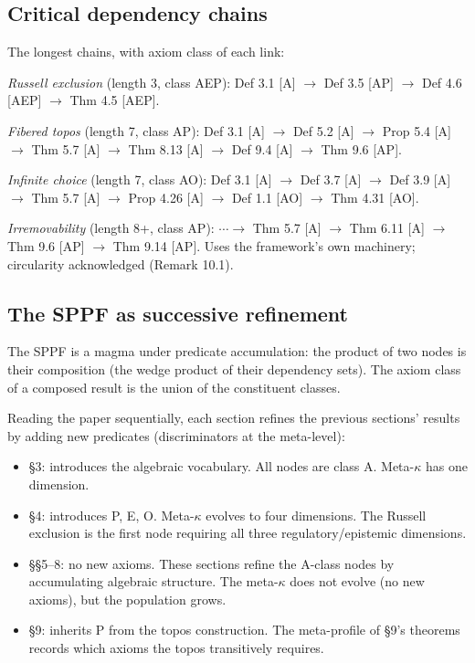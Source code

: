 \subsection{Critical dependency chains}

The longest chains, with axiom class of each link:

\emph{Russell exclusion} (length 3, class \textsf{AEP}):
Def 3.1 [\textsf{A}] $\to$ Def 3.5 [\textsf{AP}]
$\to$ Def 4.6 [\textsf{AEP}] $\to$ Thm 4.5 [\textsf{AEP}].

\emph{Fibered topos} (length 7, class \textsf{AP}):
Def 3.1 [\textsf{A}] $\to$ Def 5.2 [\textsf{A}]
$\to$ Prop 5.4 [\textsf{A}] $\to$ Thm 5.7 [\textsf{A}]
$\to$ Thm 8.13 [\textsf{A}] $\to$ Def 9.4 [\textsf{A}]
$\to$ Thm 9.6 [\textsf{AP}].

\emph{Infinite choice} (length 7, class \textsf{AO}):
Def 3.1 [\textsf{A}] $\to$ Def 3.7 [\textsf{A}]
$\to$ Def 3.9 [\textsf{A}] $\to$ Thm 5.7 [\textsf{A}]
$\to$ Prop 4.26 [\textsf{A}] $\to$ Def 1.1 [\textsf{AO}]
$\to$ Thm 4.31 [\textsf{AO}].

\emph{Irremovability} (length 8+, class \textsf{AP}):
$\cdots \to$ Thm 5.7 [\textsf{A}] $\to$ Thm 6.11
[\textsf{A}] $\to$ Thm 9.6 [\textsf{AP}] $\to$
Thm 9.14 [\textsf{AP}]. Uses the framework's own
machinery; circularity acknowledged (Remark 10.1).

\subsection{The SPPF as successive refinement}

The SPPF is a magma under predicate accumulation: the
product of two nodes is their composition (the wedge
product of their dependency sets). The axiom class of a
composed result is the union of the constituent classes.

Reading the paper sequentially, each section refines the
previous sections' results by adding new predicates
(discriminators at the meta-level):

\begin{itemize}[nosep]
  \item \S3: introduces the algebraic vocabulary. All
    nodes are class \textsf{A}. Meta-$\kappa$ has one
    dimension.
  \item \S4: introduces \textsf{P}, \textsf{E},
    \textsf{O}. Meta-$\kappa$ evolves to four dimensions.
    The Russell exclusion is the first node requiring all
    three regulatory/epistemic dimensions.
  \item \S\S5--8: no new axioms. These sections refine
    the \textsf{A}-class nodes by accumulating algebraic
    structure. The meta-$\kappa$ does not evolve (no new
    axioms), but the population grows.
  \item \S9: inherits \textsf{P} from the topos
    construction. The meta-profile of \S9's theorems
    records which axioms the topos transitively requires.
\end{itemize}

